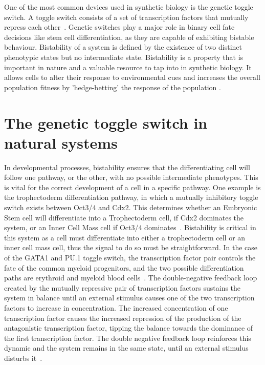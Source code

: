 
One of the most common devices used in synthetic biology is the genetic toggle switch. A toggle switch consists of a set of transcription factors that mutually repress each other~\autocite{Gardner:2000vha}. Genetic switches play a major role in binary cell fate decisions like stem cell differentiation, as they are capable of exhibiting bistable behaviour. Bistability of a system is defined by the existence of two distinct phenotypic states but no intermediate state. Bistability is a property that is important in nature and a valuable resource to tap into in synthetic biology. It allows cells to alter their response to environmental cues and increases the overall population fitness by 'hedge-betting' the response of the population \autocite{XXX}. 

\section{The genetic toggle switch in natural systems}
In developmental processes, bistability ensures that the differentiating cell will follow one pathway, or the other, with no possible intermediate phenotypes. This is vital for the correct development of a cell in a specific pathway. One example is the trophectoderm differentiation pathway, in which a mutually inhibitory toggle switch exists between Oct3/4 and Cdx2. This determines whether an Embryonic Stem cell will differentiate into a Trophectoderm cell, if Cdx2 dominates the system, or an Inner Cell Mass cell if Oct3/4 dominates~\autocite{Niwa:2005fz}. Bistability is critical in this system as a cell must differentiate into either a trophectoderm cell or an inner cell mass cell, thus the signal to do so must be straightforward. In the case of the GATA1 and PU.1 toggle switch, the transcription factor pair controls the fate of the common myeloid progenitors, and the two possible differentiation paths are erythroid and myeloid blood cells~\autocite{Chickarmane:2009by}. The double-negative feedback loop created by the mutually repressive pair of transcription factors sustains the system in balance until an external stimulus causes one of the two transcription factors to increase in concentration. The increased concentration of one transcription factor causes the increased repression of the production of the antagonistic transcription factor, tipping the balance towards the dominance of the first transcription factor. The double negative feedback loop reinforces this dynamic and the system remains in the same state, until an external stimulus disturbs it~\autocite{FerrellJr:2002fh}.

